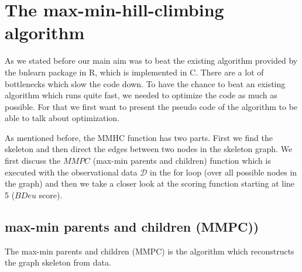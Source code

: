 			 \label{img.add}

			 \label{img.reverse}

			 \label{img.delete}
			

\chapter{The max-min-hill-climbing algorithm}

	As we stated before our main aim was to beat the existing algorithm provided by the bnlearn package in R, which is implemented in C. There are a lot of bottlenecks which slow the code down. To have the chance to beat an existing algorithm which runs quite fast, we needed to optimize the code as much as possible. For that we first want to present the pseudo code of the algorithm to be able to talk about optimization.

	 \label{img.mmhc}

	As mentioned before, the MMHC function has two parts. First we find the skeleton and then direct the edges between two nodes in the skeleton graph. We first discuss the $MMPC$ (max-min parents and children) function which is executed with the observational data $\mathcal{D}$ in the for loop (over all possible nodes in the graph) and then we take a closer look at the scoring function starting at line 5 ($BDeu$ score).

		\section{max-min parents and children (MMPC))}

			The max-min parents and children (MMPC) is the algorithm which reconstructs the graph skeleton from data.%

